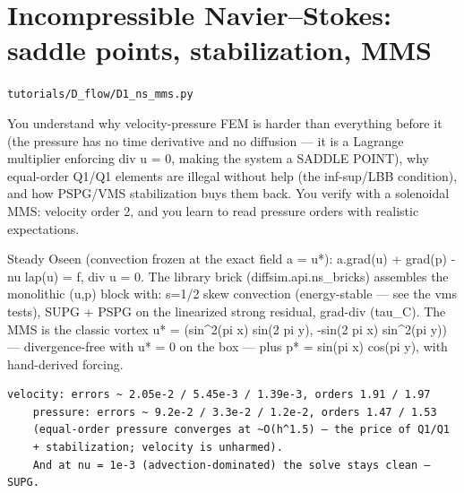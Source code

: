 \chapter{Incompressible Navier–Stokes: saddle points, stabilization, MMS}
\label{ch:D1_ns_mms}
\noindent\texttt{tutorials/D\_flow/D1\_ns\_mms.py}\\[0.75em]
\begin{outcome}
You understand why velocity-pressure FEM is harder than
everything before it (the pressure has no time derivative and no diffusion
— it is a Lagrange multiplier enforcing div u = 0, making the system a
SADDLE POINT), why equal-order Q1/Q1 elements are illegal without help
(the inf-sup/LBB condition), and how PSPG/VMS stabilization buys them
back. You verify with a solenoidal MMS: velocity order 2, and you learn to
read pressure orders with realistic expectations.
\end{outcome}

Steady Oseen (convection frozen at the exact field a = u*):
    a.grad(u) + grad(p) - nu lap(u) = f,   div u = 0.
The library brick (diffsim.api.ns\_bricks) assembles the monolithic (u,p)
block with: s=1/2 skew convection (energy-stable — see the vms tests),
SUPG + PSPG on the linearized strong residual, grad-div (tau\_C). The MMS
is the classic vortex u* = (sin\textasciicircum{}2(pi x) sin(2 pi y), -sin(2 pi x)
sin\textasciicircum{}2(pi y)) — divergence-free with u* = 0 on the box — plus
p* = sin(pi x) cos(pi y), with hand-derived forcing.

\begin{expected}
\begin{verbatim}
velocity: errors ~ 2.05e-2 / 5.45e-3 / 1.39e-3, orders 1.91 / 1.97
    pressure: errors ~ 9.2e-2 / 3.3e-2 / 1.2e-2, orders 1.47 / 1.53
    (equal-order pressure converges at ~O(h^1.5) — the price of Q1/Q1
    + stabilization; velocity is unharmed).
    And at nu = 1e-3 (advection-dominated) the solve stays clean — SUPG.
\end{verbatim}
\end{expected}

